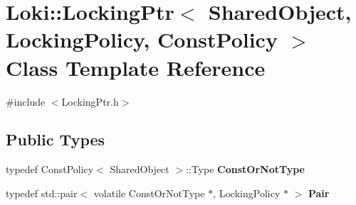 \hypertarget{classLoki_1_1LockingPtr}{}\section{Loki\+:\+:Locking\+Ptr$<$ Shared\+Object, Locking\+Policy, Const\+Policy $>$ Class Template Reference}
\label{classLoki_1_1LockingPtr}


{\ttfamily \#include $<$Locking\+Ptr.\+h$>$}

\subsection*{Public Types}
\begin{DoxyCompactItemize}
\item 
\hypertarget{classLoki_1_1LockingPtr_a63956c4e1bf0b4d1b159de16bb2c28b3}{}typedef Const\+Policy$<$ Shared\+Object $>$\+::Type {\bfseries Const\+Or\+Not\+Type}\label{classLoki_1_1LockingPtr_a63956c4e1bf0b4d1b159de16bb2c28b3}

\item 
\hypertarget{classLoki_1_1LockingPtr_ab7b6d661b1e302f1df07c6b77a148c6f}{}typedef std\+::pair$<$ volatile Const\+Or\+Not\+Type $\ast$, Locking\+Policy $\ast$ $>$ {\bfseries Pair}\label{classLoki_1_1LockingPtr_ab7b6d661b1e302f1df07c6b77a148c6f}

\end{DoxyCompactItemize}
